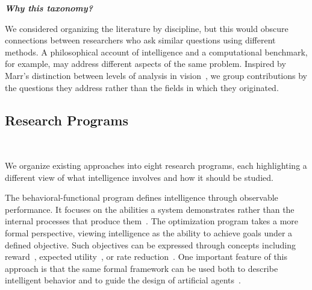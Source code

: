 \documentclass[acmsmall,screen,review,anonymous]{acmart}
\begin{document}


\vspace{2mm}
\noindent \textit{\textbf{Why this taxonomy?}} 

We considered organizing the literature by discipline, but this would obscure connections between researchers who ask similar questions using different methods.
%
A philosophical account of intelligence and a computational benchmark, for example, may address different aspects of the same problem.
%
Inspired by Marr's distinction between levels of analysis in vision~\citep{marr1982}, we group contributions by the questions they address rather than the fields in which they originated.


\subsection{Research Programs}~\label{subsec:eight_research_programs}

We organize existing approaches into eight research programs, each highlighting a different view of what intelligence involves and how it should be studied.

The behavioral-functional program defines intelligence through observable performance. 
%
It focuses on the abilities a system demonstrates rather than the internal processes that produce them~\citep{turing1950, dennett1987}. 
%
The optimization program takes a more formal perspective, viewing intelligence as the ability to achieve goals under a defined objective. 
%
Such objectives can be expressed through concepts including reward~\citep{silver2021}, expected utility~\citep{gershman2015}, or rate reduction~\citep{ma2022}. 
%
One important feature of this approach is that the same formal framework can be used both to describe intelligent behavior and to guide the design of artificial agents~\citep{legghutter2007, russellnorvig2020, schmidhuber2010, silver2021, ma2022}.
\end{document}
